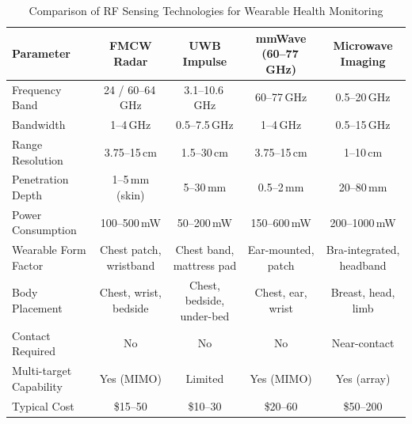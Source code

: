\documentclass[journal,twoside]{IEEEtran}
\begin{document}
\begin{table}[!t]
\centering
\caption{Comparison of RF Sensing Technologies for Wearable Health Monitoring}
\label{tab:rf_comparison}
\footnotesize
\begin{tabular}{@{}l c c c c@{}}
\toprule
\textbf{Parameter} & \textbf{FMCW Radar} & \textbf{UWB Impulse} & \textbf{mmWave (60--77\,GHz)} & \textbf{Microwave Imaging} \\
\midrule
Frequency Band & 24 / 60--64\,GHz & 3.1--10.6\,GHz & 60--77\,GHz & 0.5--20\,GHz \\
Bandwidth & 1--4\,GHz & 0.5--7.5\,GHz & 1--4\,GHz & 0.5--15\,GHz \\
Range Resolution & 3.75--15\,cm & 1.5--30\,cm & 3.75--15\,cm & 1--10\,cm \\
Penetration Depth & 1--5\,mm (skin) & 5--30\,mm & 0.5--2\,mm & 20--80\,mm \\
Power Consumption & 100--500\,mW & 50--200\,mW & 150--600\,mW & 200--1000\,mW \\
Wearable Form Factor & Chest patch, wristband & Chest band, mattress pad & Ear-mounted, patch & Bra-integrated, headband \\
Body Placement & Chest, wrist, bedside & Chest, bedside, under-bed & Chest, ear, wrist & Breast, head, limb \\
Contact Required & No & No & No & Near-contact \\
Multi-target Capability & Yes (MIMO) & Limited & Yes (MIMO) & Yes (array) \\
Typical Cost & \$15--50 & \$10--30 & \$20--60 & \$50--200 \\
\bottomrule
\end{tabular}
\end{table}
\end{document}

